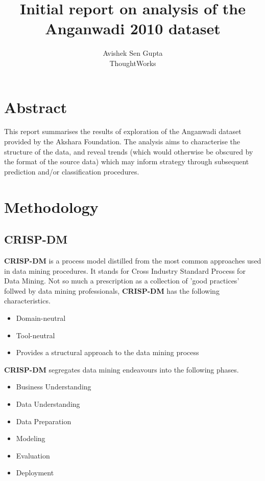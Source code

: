 \documentclass[10pt]{article}
\begin{document}
\title{Initial report on analysis of the Anganwadi 2010 dataset} 
\author{Avishek Sen Gupta\\ThoughtWorks}
\maketitle
\newpage
\tableofcontents
\newpage

\section{Abstract}
This report summarises the results of exploration of the Anganwadi dataset provided by the Akshara Foundation. The analysis aims to characterise the structure of the data, and reveal trends (which would otherwise be obscured by the format of the source data) which may inform strategy through subsequent prediction and/or classification procedures.

\newpage
\section{Methodology}
\subsection{CRISP-DM}
\textbf{CRISP-DM} is a process model distilled from the most common approaches used in data mining procedures. It stands for Cross Industry Standard Process for Data Mining. Not so much a prescription as a collection of 'good practices' follwed by data mining professionals, \textbf{CRISP-DM} has the following characteristics.

\begin{itemize}
\item Domain-neutral
\item Tool-neutral
\item Provides a structural approach to the data mining process
\end{itemize}

\textbf{CRISP-DM} segregates data mining endeavours into the following phases.

\begin{itemize}
\item Business Understanding
\item Data Understanding
\item Data Preparation
\item Modeling
\item Evaluation
\item Deployment
\end{itemize}
\end{document}
